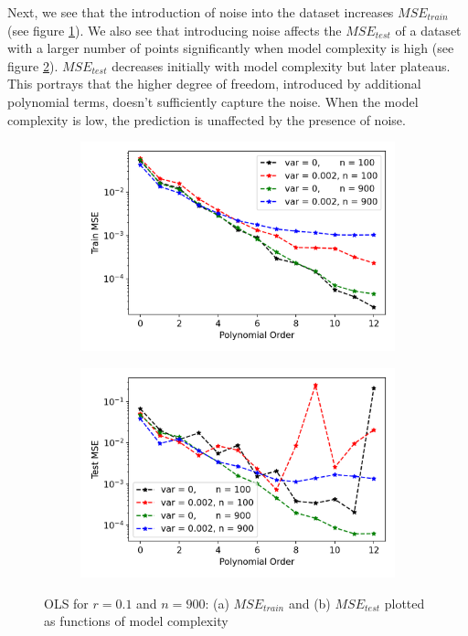 Next, we see that the introduction of noise into the dataset increases $MSE_{train}$ (see figure \ref{fig:ols4}). We also see that introducing noise affects the $MSE_{test}$ of a dataset with a larger number of points significantly when model complexity is high (see figure \ref{fig:ols5}). $MSE_{test}$ decreases initially with model complexity but later plateaus. This portrays that the higher degree of freedom, introduced by additional polynomial terms, doesn't sufficiently capture the noise. When the model complexity is low, the prediction is unaffected by the presence of noise. 

\begin{figure}[htb]
\centering
\begin{subfigure}{.5\textwidth}
  \centering
  \includegraphics[width=.9\linewidth]{Images/ols5.png}
  \caption{}
  \label{fig:ols4}
\end{subfigure}%
\begin{subfigure}{.5\textwidth}
  \centering
  \includegraphics[width=.9\linewidth]{Images/ols4.png}
  \caption{}
  \label{fig:ols5}
\end{subfigure}
\caption{OLS for $r=0.1$ and $n=900$: (a) $MSE_{train}$ and (b) $MSE_{test}$ plotted as functions of model complexity}
\label{fig:OLS2}
\end{figure}

